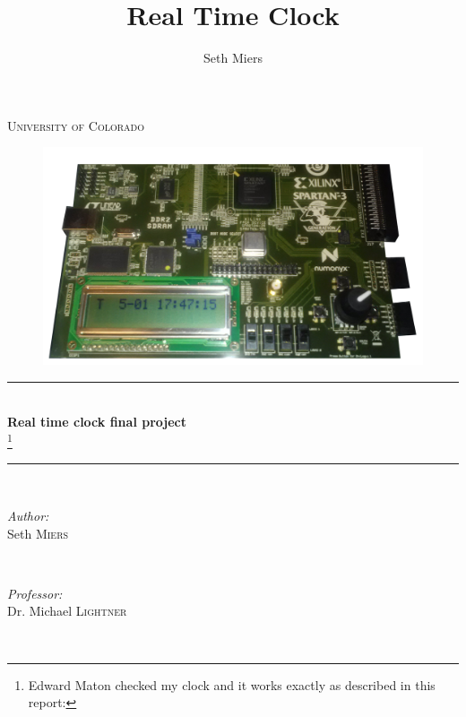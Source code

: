 \documentclass[12pt,a4paper,hidelinks]{article}            %
\begin{document}
\begin{titlepage}

\title{Real Time Clock}
\author{Seth Miers}

\vspace*{\fill}                                            %

\newcommand{\HRule}{\rule{\linewidth}{0.3mm}}              %

\center                                                    %

\textsc{\LARGE University of Colorado}\\[1.5cm]            %

\vspace{-3em}

\begin{figure}[H]
\centering
\includegraphics[width=0.7\linewidth]{Clock.png}
\label{fig:titleclock}
\end{figure}

\vspace{1em}

\HRule \\[0.4cm]
{ \huge \bfseries Real time clock final project}\\[0.4cm] \footnote{Edward Maton checked my clock and it works exactly as described in this report:} %
\HRule \\[1.5cm]

\begin{minipage}{0.4\textwidth}
\begin{flushleft} \large
\emph{Author:}\\
Seth \textsc{Miers} %
\end{flushleft}
\end{minipage}
~
\begin{minipage}{0.4\textwidth}
\begin{flushright} \large
\emph{Professor:} \\
Dr. Michael \textsc{Lightner}                                   %
\end{flushright}
\end{minipage}\\[4cm]


\end{titlepage}
\end{document}
